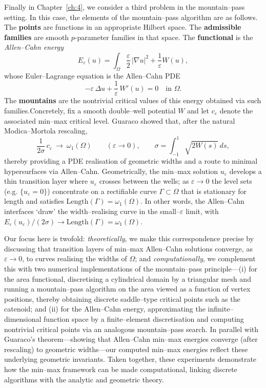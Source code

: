 \noindent Finally in Chapter~\ref{ch:4}, we consider a third problem in the mountain--pass setting. In this case, the elements of the mountain--pass algorithm are as follows. The \textbf{points} are functions in an appropriate Hilbert space. The \textbf{admissible families} are smooth $p$-parameter families in that space. The \textbf{functional} is the \emph{Allen--Cahn energy}
\[
E_\varepsilon(u)=\int_{\Omega} \frac{\varepsilon}{2}\,|\nabla u|^2+\frac{1}{\varepsilon}W(u),
\]
whose Euler--Lagrange equation is the Allen--Cahn PDE
\[
-\varepsilon\,\Delta u+\frac{1}{\varepsilon}\,W'(u)=0 \quad \text{in } \Omega.
\]
The \textbf{mountains} are the nontrivial critical values of this energy obtained via such families.Concretely, fix a smooth double--well potential $W$ and let $c_\varepsilon$ denote the associated min--max critical level. Guaraco showed that, after the natural Modica--Mortola rescaling,
\[
\frac{1}{2\sigma}\,c_\varepsilon\ \longrightarrow\ \omega_1(\Omega)\qquad(\varepsilon\to 0),
\qquad
\sigma=\int_{-1}^{1}\sqrt{2W(s)}\,ds,
\]
thereby providing a PDE realisation of geometric widths and a route to minimal hypersurfaces via Allen--Cahn. Geometrically, the min--max solution $u_\varepsilon$ develops a thin transition layer where $u_\varepsilon$ crosses between the wells; as $\varepsilon\to 0$ the level sets (e.g. $\{u_\varepsilon=0\}$) concentrate on a rectifiable curve $\Gamma\subset\Omega$ that is stationary for length and satisfies $\mathrm{Length}(\Gamma)=\omega_1(\Omega)$. In other words, the Allen--Cahn interfaces ‘draw’ the width–realising curve in the small–$\varepsilon$ limit, with $E_\varepsilon(u_\varepsilon)/(2\sigma)\to \mathrm{Length}(\Gamma)=\omega_1(\Omega)$.

Our focus here is twofold: \emph{theoretically}, we make this correspondence precise by discussing that transition layers of min--max Allen--Cahn solutions converge, as $\varepsilon\to 0$, to curves realising the widths of $\Omega$; and \emph{computationally}, we complement this with two numerical implementations of the mountain--pass principle—(i) for the area functional, discretising a cylindrical domain by a triangular mesh and running a mountain--pass algorithm on the area viewed as a function of vertex positions, thereby obtaining discrete saddle--type critical points such as the catenoid; and (ii) for the Allen--Cahn energy, approximating the infinite--dimensional function space by a finite--element discretisation and computing nontrivial critical points via an analogous mountain--pass search. In parallel with Guaraco’s theorem—showing that Allen--Cahn min--max energies converge (after rescaling) to geometric widths—our computed min--max energies reflect these underlying geometric invariants. Taken together, these experiments demonstrate how the min--max framework can be made computational, linking discrete algorithms with the analytic and geometric theory.
